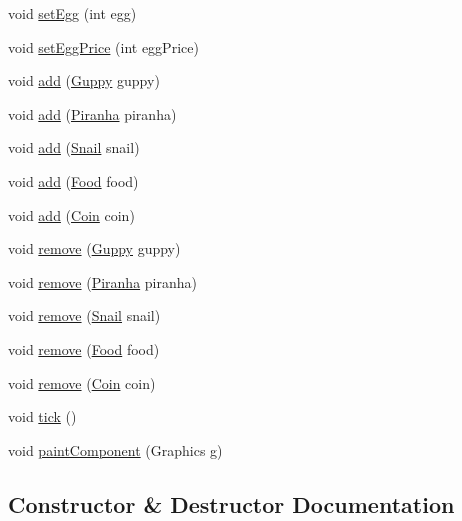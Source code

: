 \begin{DoxyCompactItemize}
\item 
void \mbox{\hyperlink{class_aquarium_a328d46bba95f6c4db241e8a4ac54e1fc}{set\+Egg}} (int egg)
\item 
void \mbox{\hyperlink{class_aquarium_aaf8f1dcec2a7a54a2e77931946224181}{set\+Egg\+Price}} (int egg\+Price)
\item 
void \mbox{\hyperlink{class_aquarium_a4548d70b3d7c88aa970388ef107ec818}{add}} (\mbox{\hyperlink{class_guppy}{Guppy}} guppy)
\item 
void \mbox{\hyperlink{class_aquarium_a96f7ccac5fe3b5a97afd0c29840f868a}{add}} (\mbox{\hyperlink{class_piranha}{Piranha}} piranha)
\item 
void \mbox{\hyperlink{class_aquarium_a884820c46118fdbc25936f01d3d06a2f}{add}} (\mbox{\hyperlink{class_snail}{Snail}} snail)
\item 
void \mbox{\hyperlink{class_aquarium_a92553ce7aa392910522f243f10965570}{add}} (\mbox{\hyperlink{class_food}{Food}} food)
\item 
void \mbox{\hyperlink{class_aquarium_a99b7bb8813dc2e0251e675b9e75906d7}{add}} (\mbox{\hyperlink{class_coin}{Coin}} coin)
\item 
void \mbox{\hyperlink{class_aquarium_a60bd4bc395dd03c5ab313ef49129c295}{remove}} (\mbox{\hyperlink{class_guppy}{Guppy}} guppy)
\item 
void \mbox{\hyperlink{class_aquarium_a7ae9e9230490e7179d90b896ea226071}{remove}} (\mbox{\hyperlink{class_piranha}{Piranha}} piranha)
\item 
void \mbox{\hyperlink{class_aquarium_a2c283c3325865e62469a426498443cd0}{remove}} (\mbox{\hyperlink{class_snail}{Snail}} snail)
\item 
void \mbox{\hyperlink{class_aquarium_a63e4f95aafbfc1cc2e081254dac69fd8}{remove}} (\mbox{\hyperlink{class_food}{Food}} food)
\item 
void \mbox{\hyperlink{class_aquarium_a39119dfb953c89eac41fda5c3b6834f0}{remove}} (\mbox{\hyperlink{class_coin}{Coin}} coin)
\item 
void \mbox{\hyperlink{class_aquarium_a62647cfa861f70d29c19fc5e27b4b77b}{tick}} ()
\item 
void \mbox{\hyperlink{class_aquarium_a1dddaa60d7c8ab3ef8addf1a1b1dfe4d}{paint\+Component}} (Graphics g)
\end{DoxyCompactItemize}


\subsection{Constructor \& Destructor Documentation}
\mbox{\label{class_aquarium_ab99a26856347e9a9732f60cfb6a78296}} 
